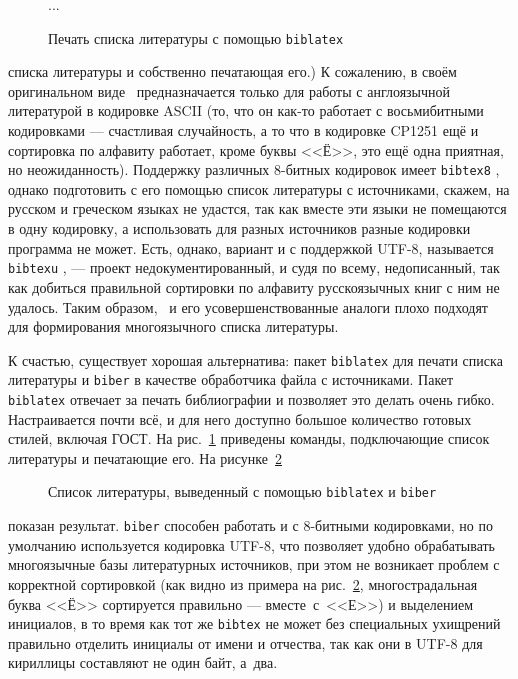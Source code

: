 \documentclass[a4paper,12pt,hyphens]{article}
\newcommand\package[1]{\texttt{#1}}
\newcommand\exe[1]{\texttt{#1}}
\begin{document}
\begin{figure}[tp]
\begin{latexcode}
\usepackage[style=gost-numeric]{biblatex}


...

\printbibliography
\end{latexcode}
\caption{Печать списка литературы с помощью \package{biblatex}}\label{biblatex1}
\end{figure}
списка литературы и собственно печатающая его.)
К сожалению, в своём оригинальном виде \BibTeX\ предназначается только
для работы с англоязычной литературой в кодировке ASCII (то, что
он как-то работает с восьмибитными кодировками --- счастливая случайность,
а то что в кодировке CP1251 ещё и сортировка по алфавиту работает,
кроме буквы <<Ё>>, это ещё одна приятная, но неожиданность). Поддержку различных
8-битных кодировок имеет \exe{bibtex8} \parencite{ctan-bibtex8},
однако подготовить с его помощью
список литературы с источниками, скажем, на русском и греческом языках
не удастся, так как вместе эти языки не помещаются в одну кодировку, а
использовать для разных источников разные кодировки программа не может.
Есть, однако, вариант и с поддержкой UTF-8, называется
\exe{bibtexu} \parencite{ctan-bibtexu,se-bibtexu},
--- проект недокументированный, и судя по всему, недописанный, так как
добиться правильной сортировки по алфавиту русскоязычных книг с ним
не удалось. Таким образом, \BibTeX\ и его усовершенствованные аналоги
плохо подходят для формирования многоязычного списка литературы.

К счастью, существует хорошая альтернатива: пакет
\package{biblatex} \parencite{ctan-biblatex,se-biblatex}
для печати списка литературы и
\exe{biber} \parencite{ctan-biber}
в качестве обработчика файла с источниками.
Пакет \package{biblatex} отвечает за печать библиографии и позволяет
это делать очень гибко. Настраивается почти всё, и для него доступно большое
количество готовых стилей, включая ГОСТ. На рис.~\ref{biblatex1}
приведены
команды, подключающие список литературы и печатающие его. На рисунке~\ref{biblatex2}%
\nocite{esin1950,yolkin1997,chebyshev1859,eliseeva2010}%
%
%
\begin{figure}[tp]
\begin{tcolorbox}[colback=white,colframe=white]
\printbibliography[keyword=example,resetnumbers=1]
\end{tcolorbox}
\caption{Список литературы, выведенный с помощью \package{biblatex} и \exe{biber}}\label{biblatex2}
\end{figure}
показан результат.
\exe{biber} способен работать и с 8-битными кодировками, но по умолчанию
используется кодировка UTF-8, что позволяет удобно обрабатывать многоязычные
базы литературных источников, при этом не возникает проблем с корректной сортировкой
(как видно из примера на рис.~\ref{biblatex2}, многострадальная буква <<Ё>>
сортируется правильно --- вместе~с~<<Е>>) и выделением инициалов, в то время как
тот же \exe{bibtex} не может без специальных ухищрений правильно отделить
инициалы от имени и отчества, так как они в UTF-8 для кириллицы составляют не
один байт, а~два.
\end{document}
